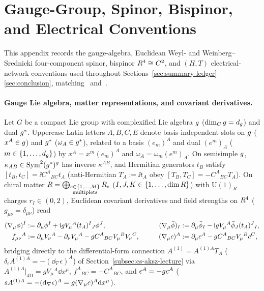 \section{Gauge-Group, Spinor, Bispinor, and Electrical Conventions}
\label{app:conventions}

This appendix records the gauge-algebra, Euclidean Weyl- and Weinberg--Srednicki four-component spinor, bispinor $R^4\cong C^2$, and $(H,T)$ electrical-network conventions used throughout Sections~\ref{sec:summary-ledger}--\ref{sec:conclusion}, matching~\cite[Ch.~26]{Weinberg} and~\cite{LLC,Repo9e833c8}.

\paragraph{Gauge Lie algebra, matter representations, and covariant derivatives.}
Let $G$ be a compact Lie group with complexified Lie algebra $g$ ($\dim_{C}g = d_{g}$) and dual $g^*$. Uppercase Latin letters $A,B,C,E$ denote basis-independent slots on $g$ ($x^A \in g$) and $g^*$ ($\omega_A \in g^*$), related to a basis $(e_m)^A$ and dual $(e^m)_A$ ($m \in \{1,\dots,d_{g}\}$) by $x^A = x^m(e_m)^A$ and $\omega_A = \omega_m(e^m)_A$. On semisimple $g$, $\kappa_{AB} \in \operatorname{Sym}^2(g^*)^{g}$ has inverse $\kappa^{AB}$, and Hermitian generators $t_B$ satisfy $[t_B, t_C] = \ii C^A{}_{BC}t_A$ (anti-Hermitian $T_A := \ii t_A$ obey $[T_B, T_C] = -C^A{}_{BC}T_A$). On chiral matter $R = \bigoplus_{\substack{s\in\{1,\dots,M\}\\\mathrm{multiplets}}}R_s$ ($I,J,K \in \{1,\dots,\dim R\}$) with $\mathrm{U}(1)_R$ charges $r_I \in (0,2)$, Euclidean covariant derivatives and field strengths on $R^4$ ($g_{\mu\nu} = \delta_{\mu\nu}$) read
\begin{equation}
\label{eq:sum-cov}
\begin{aligned}
(\nabla_\mu\phi)^I &:= \partial_\mu\phi^I + \mathrm{i} g V_\mu{}^A(t_A)^I{}_J\phi^J, &\qquad
(\nabla_\mu\bar{\phi})_I &:= \partial_\mu\bar{\phi}_I - \mathrm{i} g V_\mu{}^A\bar{\phi}_J(t_A)^J{}_I,\\
f_{\mu\nu}{}^A &:= \partial_\mu V_\nu{}^A - \partial_\nu V_\mu{}^A - g C^A{}_{BC}V_\mu{}^B V_\nu{}^C, &\qquad
(\nabla_\mu c)^A &:= \partial_\mu c^A - g C^A{}_{BC}V_\mu{}^Bc^C,
\end{aligned}
\end{equation}
bridging directly to the differential-form connection $A^{(1)} = A^{(1)A}T_A$ ($\delta_\epsilon A^{(1)A} = -(\dd_\nabla\epsilon)^A$) of Section~\ref{subsec:cs-aksz-lecture} via $A^{(1)A}|_{4\mathrm{D}} = g V_\mu{}^A\dd x^\mu$, $f^A{}_{BC} = -C^A{}_{BC}$, and $\epsilon^A = -gc^A$ ($s A^{(1)A} = -(\mathrm{d}_\nabla\epsilon)^A = g(\nabla_\mu c)^A\mathrm{d} x^\mu$).

